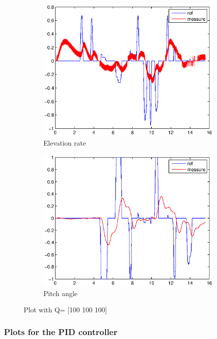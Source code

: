 \begin{figure}[H]
\graphicspath{ {Part3_pictures/}}
\begin{subfigure}{0.5\textwidth}
    \includegraphics[width=0.9\linewidth]{Part3_pictures/p3p2/Q3elevation.eps} 
    \caption{Elevation rate}
    \label{p3p2Q3e}
\end{subfigure}
\begin{subfigure}{0.5\textwidth}
    \includegraphics[width=0.9\linewidth]{Part3_pictures/p3p2/Q3pitch.eps}
    \caption{Pitch angle}
    \label{p3p2Q3p}
\end{subfigure}
\caption{Plot with Q= [100 100 100]}
\label{p3p2Q3}
\end{figure}
\newpage

\subsubsection{Plots for the PID controller}

